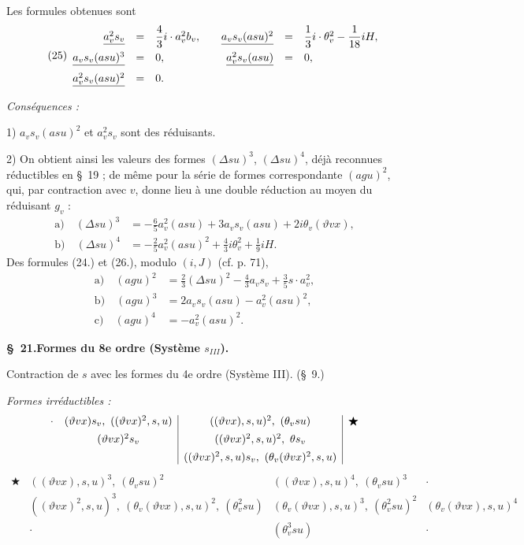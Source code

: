 \documentclass[11pt]{article}
\begin{document}
Les formules obtenues sont
\[
\tag{25}
\begin{array}{rcl@{\qquad}rcl}
\underline{a_v^2s_v}&=&\dfrac43i\cdot a_v^2b_v,
& \underline{a_v s_v(asu)^2}&=&\dfrac13i\cdot\theta_v^2-\dfrac1{18}iH,\\[0.7em]
\underline{a_v s_v(asu)^3}&=&0,
& \underline{a_v^2s_v(asu)}&=&0,\\[0.7em]
\underline{a_v^2s_v(asu)^2}&=&0.
\end{array}
\]

\noindent\emph{Conséquences :}

1) $a_v s_v(asu)^2$ et $a_v^2s_v$ sont des réduisants.

2) On obtient ainsi les valeurs des formes $(\Delta su)^3$, $(\Delta su)^4$, déjà reconnues réductibles en \S\ 19 ; de même pour la série de formes correspondante $(agu)^2$, qui, par contraction avec $v$, donne lieu à une double réduction au moyen du réduisant $g_v$ :
\[
\tag{26}
\begin{aligned}
\text{a)}\quad (\Delta su)^3&=-\frac65a_v^2(asu)+3a_v s_v(asu)+2i\theta_v(\vartheta v x),\\
\text{b)}\quad (\Delta su)^4&=-\frac25a_v^2(asu)^2+\frac43i\theta_v^2+\frac19iH.
\end{aligned}
\]
Des formules (24.) et (26.), modulo $(i,J)$ (cf. p. 71),
\[
\tag{27}
\begin{aligned}
\text{a)}\quad (agu)^2&=\frac23(\Delta su)^2-\frac43a_v s_v+\frac35s\cdot a_v^2,\\
\text{b)}\quad (agu)^3&=2a_v s_v(asu)-a_v^2(asu)^2,\\
\text{c)}\quad (agu)^4&=-a_v^2(asu)^2.
\end{aligned}
\]


\begin{center}
\textbf{\S\ 21.\quad Formes du 8e ordre (Système $s_{III}$).}
\end{center}

Contraction de $s$ avec les formes du 4e ordre (Système III). (\S\ 9.)

\noindent\emph{Formes irréductibles :}
\[
\begin{array}{c@{\quad}c|c|c}
\cdot
& (\vartheta v x)s_v,\ ((\vartheta v x)^2,s,u)
& ((\vartheta v x),s,u)^2,\ (\theta_v su)
& \bigstar\\[0.45em]
& (\vartheta v x)^2s_v
& ((\vartheta v x)^2,s,u)^2,\ \theta s_v
& \\[0.45em]
&& ((\vartheta v x)^2,s,u)s_v,\ (\theta_v(\vartheta v x)^2,s,u)
&
\end{array}
\]
\[
\begin{array}{c|c|c|c}
\bigstar
& ((\vartheta v x),s,u)^3,\ (\theta_v su)^2
& ((\vartheta v x),s,u)^4,\ (\theta_v su)^3
& \cdot\\[0.45em]
& ((\vartheta v x)^2,s,u)^3,\ (\theta_v(\vartheta v x),s,u)^2,\ (\theta_v^2su)
& (\theta_v(\vartheta v x),s,u)^3,\ (\theta_v^2su)^2
& (\theta_v(\vartheta v x),s,u)^4\\[0.45em]
& \cdot
& (\theta_v^3su)
& \cdot
\end{array}
\]
\end{document}
